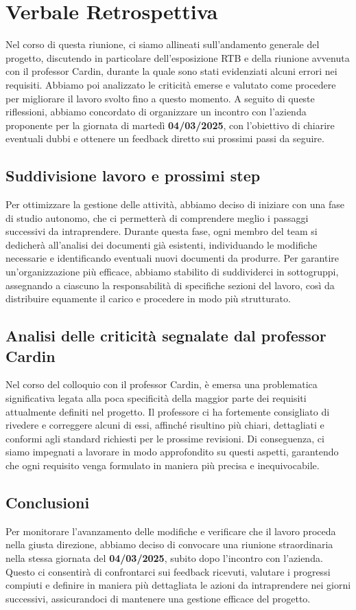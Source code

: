 \documentclass{article}
\begin{document}
\section{Verbale Retrospettiva}
Nel corso di questa riunione, ci siamo allineati sull'andamento generale del progetto, discutendo in particolare dell'esposizione RTB e della riunione avvenuta con il professor Cardin, durante la quale sono stati evidenziati alcuni errori nei requisiti. Abbiamo poi analizzato le criticità emerse e valutato come procedere per migliorare il lavoro svolto fino a questo momento. A seguito di queste riflessioni, abbiamo concordato di organizzare un incontro con l'azienda proponente per la giornata di martedì \textbf{04/03/2025}, con l'obiettivo di chiarire eventuali dubbi e ottenere un feedback diretto sui prossimi passi da seguire.
\subsection{Suddivisione lavoro e prossimi step}
Per ottimizzare la gestione delle attività, abbiamo deciso di iniziare con una fase di studio autonomo, che ci permetterà di comprendere meglio i passaggi successivi da intraprendere. Durante questa fase, ogni membro del team si dedicherà all'analisi dei documenti già esistenti, individuando le modifiche necessarie e identificando eventuali nuovi documenti da produrre. Per garantire un'organizzazione più efficace, abbiamo stabilito di suddividerci in sottogruppi, assegnando a ciascuno la responsabilità di specifiche sezioni del lavoro, così da distribuire equamente il carico e procedere in modo più strutturato.
\subsection{Analisi delle criticità segnalate dal professor Cardin}
Nel corso del colloquio con il professor Cardin, è emersa una problematica significativa legata alla poca specificità della maggior parte dei requisiti attualmente definiti nel progetto. Il professore ci ha fortemente consigliato di rivedere e correggere alcuni di essi, affinché risultino più chiari, dettagliati e conformi agli standard richiesti per le prossime revisioni. Di conseguenza, ci siamo impegnati a lavorare in modo approfondito su questi aspetti, garantendo che ogni requisito venga formulato in maniera più precisa e inequivocabile.
\subsection{Conclusioni}
Per monitorare l'avanzamento delle modifiche e verificare che il lavoro proceda nella giusta direzione, abbiamo deciso di convocare una riunione straordinaria nella stessa giornata del \textbf{04/03/2025}, subito dopo l'incontro con l'azienda. Questo ci consentirà di confrontarci sui feedback ricevuti, valutare i progressi compiuti e definire in maniera più dettagliata le azioni da intraprendere nei giorni successivi, assicurandoci di mantenere una gestione efficace del progetto.
\end{document}
